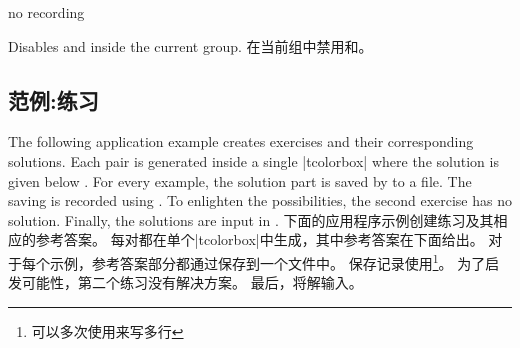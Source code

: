 \begin{docTcbKey}[][doc new=2014-11-28]{no recording}{}{}
\begin{stripedbox}
Disables  and  inside the current   group.
\tcblower
在当前组中禁用和。
\end{stripedbox}
  
\end{docTcbKey}

\subsection{范例:练习}\label{sec:recording-exercises}
\begin{stripedbox}
The following application example creates exercises and their corresponding solutions. 
Each pair is generated inside a single |tcolorbox| where the solution is given below . 
For every example, the solution part is saved by  to a file. 
The saving is recorded using . 
To enlighten the possibilities, the second exercise has no solution. 
Finally, the solutions are input in .
\tcblower
下面的应用程序示例创建练习及其相应的参考答案。%
每对都在单个|tcolorbox|中生成，其中参考答案在下面给出。%
对于每个示例，参考答案部分都通过保存到一个文件中。%
保存记录使用\footnote{可以多次使用来写多行}。%
为了启发可能性，第二个练习没有解决方案。%
最后，将解输入。
\end{stripedbox}



